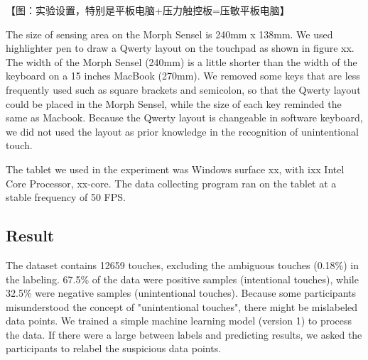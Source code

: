 
【图：实验设置，特别是平板电脑+压力触控板=压敏平板电脑】

The size of sensing area on the Morph Sensel is 240mm x 138mm. We used highlighter pen to draw a Qwerty layout on the touchpad as shown in figure xx. The width of the Morph Sensel (240mm) is a little shorter than the width of the keyboard on a 15 inches MacBook (270mm). We removed some keys that are less frequently used such as square brackets and semicolon, so that the Qwerty layout could be placed in the Morph Sensel, while the size of each key reminded the same as Macbook. Because the Qwerty layout is changeable in software keyboard, we did not used the layout as prior knowledge in the recognition of unintentional touch.


The tablet we used in the experiment was Windows surface xx, with ixx Intel Core Processor, xx-core. The data collecting program ran on the tablet at a stable frequency of 50 FPS.

\subsection{Result}

The dataset contains 12659 touches, excluding the ambiguous touches (0.18\%) in the labeling. 67.5\% of the data were positive samples (intentional touches), while 32.5\% were negative samples (unintentional touches). Because some participants misunderstood the concept of "unintentional touches", there might be mislabeled data points. We trained a simple machine learning model (version 1) to process the data. If there were a large between labels and predicting results, we asked the participants to relabel the suspicious data points.


